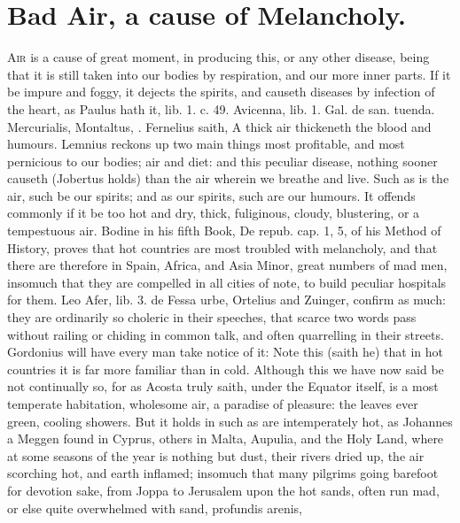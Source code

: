 {\section{Bad Air, a cause of Melancholy.}

\lettrine{A}{ir} is a cause of great moment, in producing this, or any other
disease, being that it is still taken into our bodies by respiration,
and our more inner parts. If it be impure and foggy, it dejects
the spirits, and causeth diseases by infection of the heart, as Paulus
hath it, lib. 1. c. 49. Avicenna, lib. 1. Gal. de san. tuenda.
Mercurialis, Montaltus, \etc{}. Fernelius saith, A thick air
thickeneth the blood and humours. Lemnius reckons up two main
things most profitable, and most pernicious to our bodies; air and
diet: and this peculiar disease, nothing sooner causeth (Jobertus
holds) than the air wherein we breathe and live. Such as is the
air, such be our spirits; and as our spirits, such are our humours. It
offends commonly if it be too hot and dry, thick, fuliginous,
cloudy, blustering, or a tempestuous air. Bodine in his fifth Book, De
repub. cap. 1, 5, of his Method of History, proves that hot countries
are most troubled with melancholy, and that there are therefore in
Spain, Africa, and Asia Minor, great numbers of mad men, insomuch that
they are compelled in all cities of note, to build peculiar hospitals
for them. Leo Afer, lib. 3. de Fessa urbe, Ortelius and Zuinger,
confirm as much: they are ordinarily so choleric in their speeches,
that scarce two words pass without railing or chiding in common talk,
and often quarrelling in their streets. Gordonius will have every
man take notice of it: Note this (saith he) that in hot countries it is
far more familiar than in cold. Although this we have now said be not
continually so, for as Acosta truly saith, under the Equator
itself, is a most temperate habitation, wholesome air, a paradise of
pleasure: the leaves ever green, cooling showers. But it holds in such
as are intemperately hot, as Johannes a Meggen found in Cyprus,
others in Malta, Aupulia, and the Holy Land, where at some
seasons of the year is nothing but dust, their rivers dried up, the air
scorching hot, and earth inflamed; insomuch that many pilgrims going
barefoot for devotion sake, from Joppa to Jerusalem upon the hot sands,
often run mad, or else quite overwhelmed with sand, profundis arenis,
}
